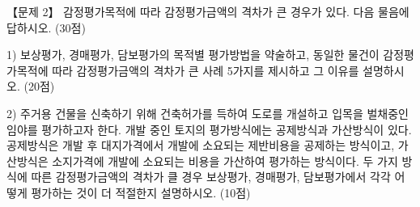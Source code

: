 \begin{longquestion}{【문제 2】}
감정평가목적에 따라 감정평가금액의 격차가 큰 경우가 있다. 다음 물음에 답하시오. (30점) \par
1) 보상평가, 경매평가, 담보평가의 목적별 평가방법을 약술하고, 동일한 물건이 감정평가목적에 따라 감정평가금액의 격차가 큰 사례 5가지를 제시하고 그 이유를 설명하시오. (20점) \par
2) 주거용 건물을 신축하기 위해 건축허가를 득하여 도로를 개설하고 입목을 벌채중인 임야를 평가하고자 한다. 개발 중인 토지의 평가방식에는 공제방식과 가산방식이 있다. 공제방식은 개발 후 대지가격에서 개발에 소요되는 제반비용을 공제하는 방식이고, 가산방식은 소지가격에 개발에 소요되는 비용을 가산하여 평가하는 방식이다. 두 가지 방식에 따른 감정평가금액의 격차가 클 경우 보상평가, 경매평가, 담보평가에서 각각 어떻게 평가하는 것이 더 적절한지 설명하시오. (10점) \par
\end{longquestion}
